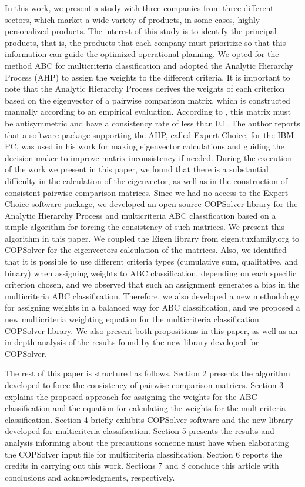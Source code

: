 \documentclass[10pt,fleqn,a4paper,twoside]{article}
\begin{document}
		In this work, we present a study with three companies from three different sectors, which market a wide variety of products, in some cases, highly personalized products. The interest of this study is to identify the principal products, that is, the products that each company must prioritize so that this information can guide the optimized operational planning. We opted for the method ABC for multicriteria classification and adopted the Analytic Hierarchy Process (AHP) \citep{Saaty1987} to assign the weights to the different criteria. It is important to note that the Analytic Hierarchy Process derives the weights of each criterion based on the eigenvector of a pairwise comparison matrix, which is constructed manually according to an empirical evaluation. According to \cite{Saaty1987}, this matrix must be antisymmetric and have a consistency rate of less than 0.1.  The author reports that a software package supporting the AHP, called Expert Choice, for the IBM PC, was used in his work for making eigenvector calculations and guiding the decision maker to improve matrix inconsistency if needed. During the execution of the work we present in this paper, we found that there is a substantial difficulty in the calculation of the eigenvector, as well as in the construction of consistent pairwise comparison matrices. Since we had no access to the Expert Choice software package, we developed an open-source COPSolver library for the Analytic Hierarchy Process and multicriteria ABC classification based on a simple algorithm for forcing the consistency of such matrices. We present this algorithm in this paper. We coupled the Eigen library from eigen.tuxfamily.org to COPSolver for the eigenvectors calculation of the matrices. Also, we identified that it is possible to use different criteria types (cumulative sum, qualitative, and binary) when assigning weights to ABC classification, depending on each specific criterion chosen, and we observed that such an assignment generates a bias in the multicriteria ABC classification. Therefore, we also developed a new methodology for assigning weights in a balanced way for ABC classification, and we proposed a new multicriteria weighting equation for the multicriteria classification COPSolver library. We also present both propositions in this paper, as well as an in-depth analysis of the results found by the new library developed for COPSolver.
		
		The rest of this paper is structured as follows. Section 2 presents the algorithm developed to force the consistency of pairwise comparison matrices. Section 3 explains the proposed approach for assigning the weights for the ABC classification and the equation for calculating the weights for the multicriteria classification. Section 4 briefly exhibits COPSolver software and the new library developed for multicriteria classification. Section 5 presents the results and analysis informing about the precautions someone must have when elaborating the COPSolver input file for multicriteria classification. Section 6 reports the credits in carrying out this work. Sections 7 and 8 conclude this article with conclusions and acknowledgments, respectively.
    
\end{document}
